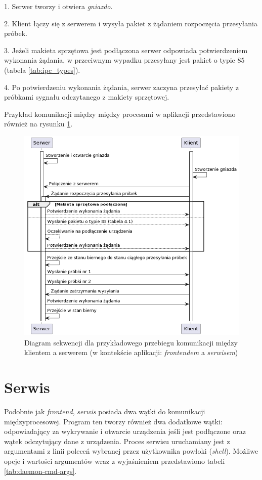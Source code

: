 1. Serwer tworzy i otwiera \textit{gniazdo}.

2. Klient łączy się z serwerem i wysyła pakiet z żądaniem rozpoczęcia przesyłania próbek.

3. Jeżeli makieta sprzętowa jest podłączona serwer odpowiada potwierdzeniem wykonania żądania,
w przeciwnym wypadku przesyłany jest pakiet o typie $85$ (tabela \ref{tab:ipc_types}).

4. Po potwierdzeniu wykonania żądania, serwer zaczyna przesyłać pakiety z próbkami sygnału odczytanego z makiety sprzętowej.

Przykład komunikacji między między procesami w aplikacji przedstawiono również na rysunku \ref{fig:ipc_seq}.

\begin{figure}[h!]
    \centering 
    \includegraphics[scale=0.75]{pl/media/ipc_sequence.png}
    \caption{Diagram sekwencji dla przykładowego przebiegu komunikacji między klientem a serwerem (w kontekście aplikacji: 
    \textit{frontendem} a \textit{serwisem})}
    \label{fig:ipc_seq}
\end{figure}

\newpage

\section{Serwis}

Podobnie jak \textit{frontend}, \textit{serwis} posiada dwa wątki do komunikacji międzyprocesowej.
Program ten tworzy również dwa dodatkowe wątki: odpowiadający za wykrywanie i otwarcie urządzenia jeśli jest podłączone
oraz wątek odczytujący dane z urządzenia.
Proces serwisu uruchamiany jest z argumentami z linii poleceń wybranej przez użytkownika powłoki
(\textit{shell}). Możliwe opcje i wartości argumentów wraz z wyjaśnieniem przedstawiono tabeli \ref{tab:daemon-cmd-args}.

